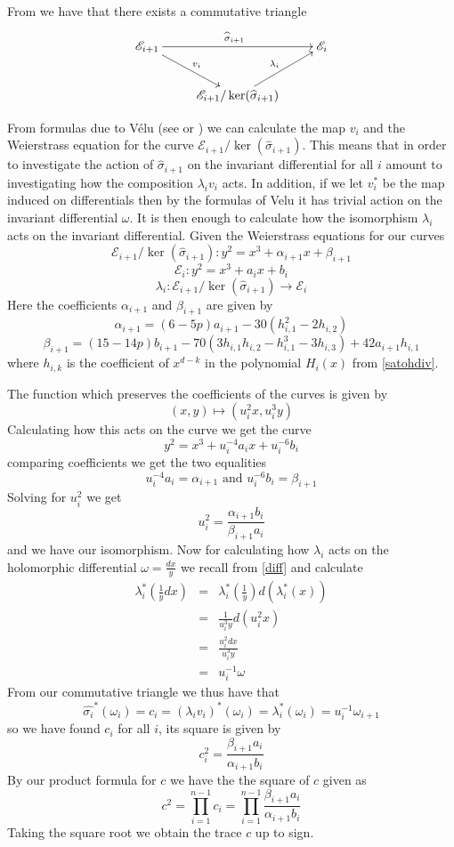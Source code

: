 From \cite{AEC} we have that there exists a commutative triangle
$$
\xymatrix{
  \mathscr{E}_{i+1} \ar[rr]^{\widehat{\sigma}_{i+1}} \ar[dr]^{v_{i}} && \mathscr{E}_i \\
  & \mathscr{E}_{i+1}/\ker(\widehat{\sigma}_{i+1}) \ar[ur]^{\lambda_i} & 
}
$$

From formulas due to Vélu (see \cite{Velu} or \cite{Sato}) we can calculate the map
$v_i$ and the Weierstrass equation for the curve $\mathscr{E}_{i+1}/\ker(\widehat{\sigma}_{i+1})$.
This means that in order to investigate the action of
$\widehat{\sigma}_{i+1}$ on the invariant differential for all $i$ amount to investigating
how the composition $\lambda_i v_i$ acts. In addition, if we let $v_i^*$ be the map induced 
on differentials then by the formulas of Velu it has trivial action on the invariant differential $\omega$.
It is then enough to calculate how the isomorphism $\lambda_i$ acts on the invariant differential. 
Given the Weierstrass equations for our curves
$$ \mathscr{E}_{i+1}/\ker(\widehat{\sigma}_{i+1}): y^2 = x^3 + \alpha_{i+1}x + \beta_{i+1}$$
$$ \mathscr{E}_i: y^2 = x^3 + a_i x + b_i $$
$$ \lambda_i: \mathscr{E}_{i+1}/\ker(\widehat{\sigma}_{i+1}) \rightarrow \mathscr{E}_i $$
Here the coefficients $\alpha_{i+1}$ and $\beta_{i+1}$ are given by
$$\alpha_{i+1} = (6-5p)a_{i+1}-30(h_{i,1}^2-2h_{i,2})$$
$$\beta_{i+1}  = (15-14p)b_{i+1}-70(3h_{i,1}h_{i,2}-h_{i,1}^3-3h_{i,3})+42a_{i+1}h_{i,1}$$
where $h_{i,k}$ is the coefficient of $x^{d-k}$ in the polynomial $H_i(x)$ from \ref{satohdiv}.

The function which preserves the coefficients of the curves is given by
$$(x,y) \mapsto (u_i^2 x, u_i^3 y) $$
Calculating how this acts on the curve we get the curve
$$ y^2 = x^3 + u_i^{-4} a_i x + u_i^{-6} b_i$$
comparing coefficients we get the two equalities
$$ u_i^{-4} a_i = \alpha_{i+1} \text{ and } u_i^{-6} b_i = \beta_{i+1} $$
Solving for $u_i^2$ we get
$$ u_i^2 = \frac{\alpha_{i+1} b_i}{\beta_{i+1} a_i} $$
and we have our isomorphism. Now for calculating how $\lambda_i$ acts on the holomorphic
differential $\omega=\frac{dx}{y}$ we recall from \ref{diff} and calculate
\begin{eqnarray}
 \lambda_i^*(\frac{1}{y} dx) &=& \lambda_i^*(\frac{1}{y}) d(\lambda_i^*(x)) \nonumber \\
			     &=& \frac{1}{u_i^3 y} d(u_i^2 x) \nonumber \\
			     &=& \frac{u_i^2 dx}{u_i^3 y} \nonumber \\
			     &=& u_i^{-1} \omega \nonumber
\end{eqnarray}
From our commutative triangle we thus have that
$$ \widehat{\sigma_i}^*(\omega_i) = c_i = (\lambda_i v_i)^*(\omega_i) = \lambda_i^*(\omega_i) = u_i^{-1}\omega_{i+1}$$
so we have found $c_i$ for all $i$, its square is given by
$$ c_i^2 = \frac{\beta_{i+1} a_i}{\alpha_{i+1} b_i} $$
By our product formula for $c$ we have the the square of $c$ given as
$$ c^2 = \prod_{i=1}^{n-1} c_i = \prod_{i=1}^{n-1} \frac{\beta_{i+1} a_i}{\alpha_{i+1} b_i} $$
Taking the square root we obtain the trace $c$ up to sign.

